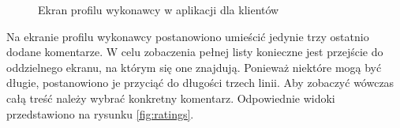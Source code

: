 \begin{figure}[ht]
\begin{subfigure}[t]{0.32\textwidth}
  \end{subfigure}
  \caption[Ekran profilu wykonawcy]{Ekran profilu wykonawcy w aplikacji dla klientów}
  \label{fig:profile}
\end{figure}

Na ekranie profilu wykonawcy postanowiono umieścić jedynie trzy ostatnio dodane komentarze. W celu zobaczenia pełnej listy konieczne jest przejście do oddzielnego ekranu, na którym się one znajdują. Ponieważ niektóre mogą być długie, postanowiono je przyciąć do długości trzech linii. Aby zobaczyć wówczas całą treść należy wybrać konkretny komentarz. Odpowiednie widoki przedstawiono na rysunku \ref{fig:ratings}.

